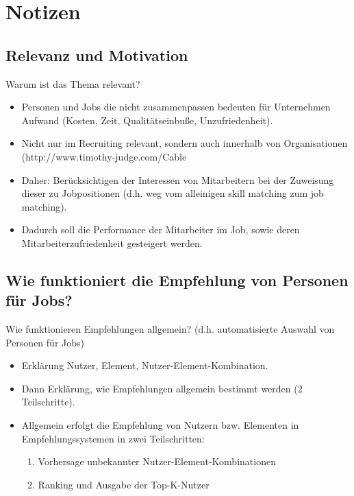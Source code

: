 \chapter{Notizen}
\label{ch:notizen}

\section{Relevanz und Motivation}
\label{ch:notizen:relevanzMotivation}
Warum ist das Thema relevant?
\begin{itemize}
    \item Personen und Jobs die nicht zusammenpassen bedeuten für Unternehmen Aufwand (Kosten, Zeit, Qualitätseinbuße, Unzufriedenheit).
    \item Nicht nur im Recruiting relevant, sondern auch innerhalb von Organisationen (http://www.timothy-judge.com/Cable%
    \item Daher: Berücksichtigen der Interessen von Mitarbeitern bei der Zuweisung dieser zu Jobpositionen (d.h. weg vom alleinigen skill matching zum job matching).
    \item Dadurch soll die Performance der Mitarbeiter im Job, sowie deren Mitarbeiterzufriedenheit gesteigert werden.
\end{itemize}

\section{Wie funktioniert die Empfehlung von Personen für Jobs?}
\label{ch:notizen:maEmpfehlung}
Wie funktionieren Empfehlungen allgemein? (d.h. automatisierte Auswahl von Personen für Jobs)
\begin{itemize}
    \item Erklärung Nutzer, Element, Nutzer-Element-Kombination.
    \item Dann Erklärung, wie Empfehlungen allgemein bestimmt werden (2 Teilschritte).
    \item Allgemein erfolgt die Empfehlung von Nutzern bzw. Elementen in Empfehlungssystemen in zwei Teilschritten:
    \begin{enumerate}
        \item Vorhersage unbekannter Nutzer-Element-Kombinationen
        \item Ranking und Ausgabe der Top-K-Nutzer
    \end{enumerate}
\end{itemize}

